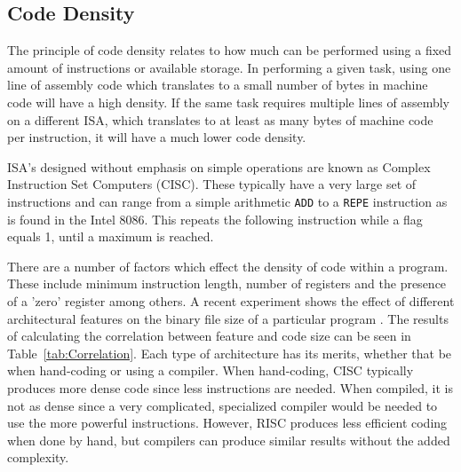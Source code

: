 \documentclass[12pt,a4paper]{article}
\begin{document}
\subsection{Code Density}
The principle of code density relates to how much can be performed using a fixed amount of instructions or available storage. In performing a given task, using one line of assembly code which translates to a small number of bytes in machine code will have a high density. If the same task requires multiple lines of assembly on a different ISA, which translates to at least as many bytes of machine code per instruction, it will have a much lower code density. 

ISA's designed without emphasis on simple operations are known as Complex Instruction Set Computers (CISC). These typically have a very large set of instructions and can range from a simple arithmetic \texttt{ADD} to a \texttt{REPE} instruction as is found in the Intel 8086. \cite{8086:InstructionSet} This repeats the following instruction while a flag equals 1, until a maximum is reached. 

There are a number of factors which effect the density of code within a program. These include minimum instruction length, number of registers and the presence of a 'zero' register among others. A recent experiment shows the effect of different architectural features on the binary file size of a particular program \cite{Density:Correlation}. The results of calculating the correlation between feature and code size can be seen in Table~\ref{tab:Correlation}. Each type of architecture has its merits, whether that be when hand-coding or using a compiler. When hand-coding, CISC typically produces more dense code since less instructions are needed. When compiled, it is not as dense since a very complicated, specialized compiler would be needed to use the more powerful instructions. However, RISC produces less efficient coding when done by hand, but compilers can produce similar results without the added complexity.
\end{document}

